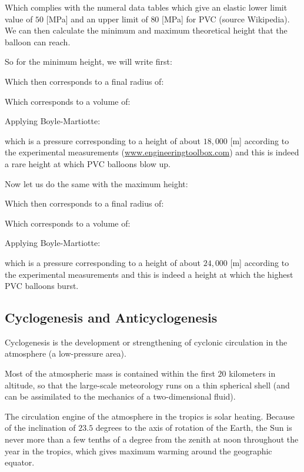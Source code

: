 	Which complies with the numeral data tables which give an elastic lower limit value of $50$ [MPa] and an upper limit of $80$ [MPa] for PVC (source Wikipedia). We can then calculate the minimum and maximum theoretical height that the balloon can reach.

	So for the minimum height, we will write first:
	
	Which then corresponds to a final radius of:
	
	Which corresponds to a volume of:
	
	Applying Boyle-Martiotte:
	
	which is a pressure corresponding to a height of about $18,000$ [m] according to the experimental measurements (\url{www.engineeringtoolbox.com}) and this is indeed a rare height at which PVC balloons blow up.

	Now let us do the same with the maximum height:
	

	Which then corresponds to a final radius of:
	
	Which corresponds to a volume of:
	
	Applying Boyle-Martiotte:
	
	which is a pressure corresponding to a height of about $24,000$ [m] according to the experimental measurements and this is indeed a height at which the highest PVC balloons burst.
	
	\subsection{Cyclogenesis and Anticyclogenesis}
	Cyclogenesis is the development or strengthening of cyclonic circulation in the atmosphere (a low-pressure area). 
	
	Most of the atmospheric mass is contained within the first $20$ kilometers in altitude, so that the large-scale meteorology runs on a thin spherical shell (and can be assimilated to the mechanics of a two-dimensional fluid).

	The circulation engine of the atmosphere in the tropics is solar heating. Because of the inclination of $23.5$ degrees to the axis of rotation of the Earth, the Sun is never more than a few tenths of a degree from the zenith at noon throughout the year in the tropics, which gives maximum warming around the geographic equator.

